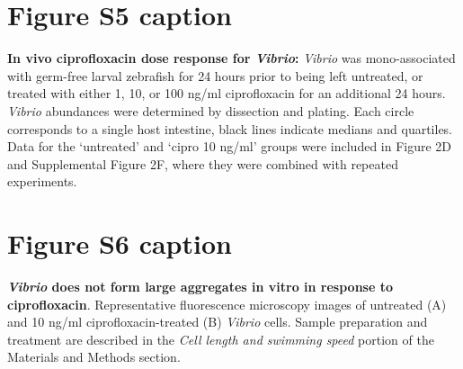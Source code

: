 \documentclass[12pt]{article}
\begin{document}
\section*{Figure S5 caption}
\textbf{In vivo ciprofloxacin dose response for \textit{Vibrio}:} \textit{Vibrio} was mono-associated with germ-free larval zebrafish for 24 hours prior to being left untreated, or treated with either 1, 10, or 100 ng/ml ciprofloxacin for an additional 24 hours.  \textit{Vibrio} abundances were determined by dissection and plating. Each circle corresponds to a single host intestine, black lines indicate medians and quartiles. Data for the `untreated' and `cipro 10 ng/ml' groups were included in Figure 2D and Supplemental Figure 2F, where they were combined with repeated experiments. 

\section*{Figure S6 caption}
\textbf{\textit{Vibrio} does not form large aggregates in vitro in response to ciprofloxacin}. Representative fluorescence microscopy images of untreated (A) and 10 ng/ml ciprofloxacin-treated (B) \textit{Vibrio} cells. Sample preparation and treatment are described in the \textit{Cell length and swimming speed} portion of the Materials and Methods section.
\end{document}
